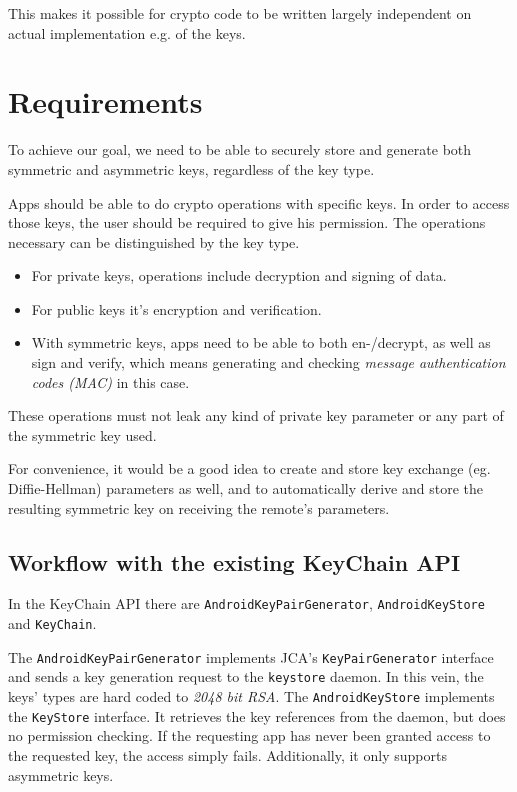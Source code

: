 \documentclass[a4paper]{scrartcl}
\begin{document}
		This makes it possible for crypto code to be written largely independent on actual implementation e.g. of the keys.

	\section{Requirements}
		To achieve our goal, we need to be able to securely store and generate both symmetric and asymmetric keys, regardless of the key type.

		Apps should be able to do crypto operations with specific keys. In order to access those keys, the user should be required to give his permission. The operations necessary can be distinguished by the key type.
		\begin{itemize}
			\item For private keys, operations include decryption and signing of data.
			\item For public keys it's encryption and verification.
			\item With symmetric keys, apps need to be able to both en-/decrypt, as well as sign and verify, which means generating and checking {\em message authentication codes (MAC)} in this case.
		\end{itemize}

		These operations must not leak any kind of private key parameter or any part of the symmetric key used.

		For convenience, it would be a good idea to create and store key exchange (eg. Diffie-Hellman) parameters as well, and to automatically derive and store the resulting symmetric key on receiving the remote's parameters. %

	\subsection{Workflow with the existing KeyChain API}
		In the KeyChain API there are \texttt{AndroidKeyPairGenerator}, \texttt{AndroidKeyStore} \linebreak and \texttt{KeyChain}.

		The \texttt{AndroidKeyPairGenerator} implements JCA's \texttt{KeyPairGenerator} interface and sends a key generation request to the \texttt{keystore} daemon. In this vein, the keys' types are hard coded to {\em 2048 bit RSA}. The \texttt{AndroidKeyStore} implements the \texttt{KeyStore} interface. It retrieves the key references from the daemon, but does no permission checking. If the requesting app has never been granted access to the requested key, the access simply fails. Additionally, it only supports asymmetric keys.
\end{document}
